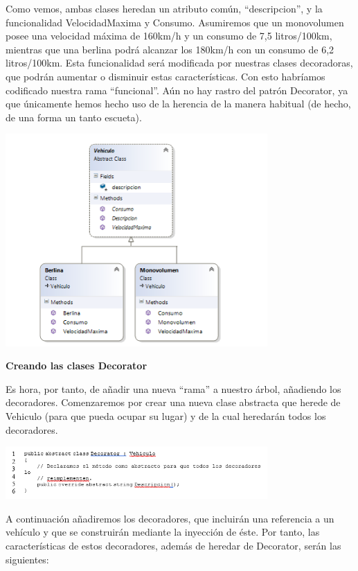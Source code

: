\begin{flushleft}
Como vemos, ambas clases heredan un atributo común, “descripcion”, y la funcionalidad VelocidadMaxima y Consumo. Asumiremos que un monovolumen posee una velocidad máxima de 160km/h y un consumo de 7,5 litros/100km, mientras que una berlina podrá alcanzar los 180km/h con un consumo de 6,2 litros/100km. Esta funcionalidad será modificada por nuestras clases decoradoras, que podrán aumentar o disminuir estas características.
Con esto habríamos codificado nuestra rama “funcional”. Aún no hay rastro del patrón Decorator, ya que únicamente hemos hecho uso de la herencia de la manera habitual (de hecho, de una forma un tanto escueta).
\begin{center}
	\includegraphics[width=10cm]{./Imagenes/decorator6} 
	\end{center}

\textbf{Creando las clases Decorator}

Es hora, por tanto, de añadir una nueva “rama” a nuestro árbol, añadiendo los decoradores. Comenzaremos por crear una nueva clase abstracta que herede de Vehiculo (para que pueda ocupar su lugar) y de la cual heredarán todos los decoradores.
\begin{center}
	\includegraphics[width=10cm]{./Imagenes/decorator7} 
	\end{center}

A continuación añadiremos los decoradores, que incluirán una referencia a un vehículo y que se construirán mediante la inyección de éste. Por tanto, las características de estos decoradores, además de heredar de Decorator, serán las siguientes:


\end{flushleft}
